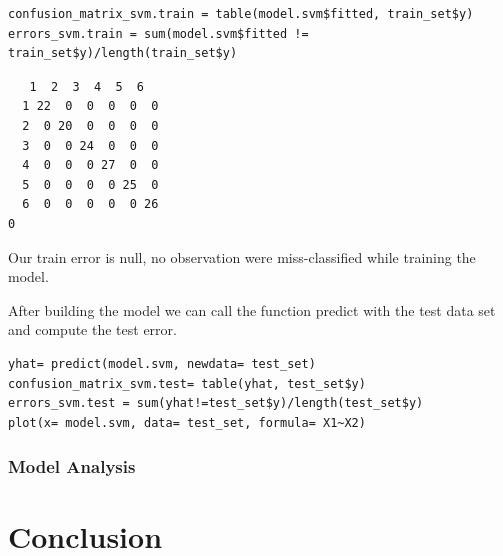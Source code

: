 \documentclass[]{report}
\begin{document}
\begin{lstlisting}
confusion_matrix_svm.train = table(model.svm$fitted, train_set$y)
errors_svm.train = sum(model.svm$fitted != train_set$y)/length(train_set$y)
\end{lstlisting}
\begin{verbatim}
   1  2  3  4  5  6
  1 22  0  0  0  0  0
  2  0 20  0  0  0  0
  3  0  0 24  0  0  0
  4  0  0  0 27  0  0
  5  0  0  0  0 25  0
  6  0  0  0  0  0 26
0
\end{verbatim}
Our train error is null, no observation were miss-classified while training the model.

After building the model we can call the function predict with the test data set and compute the test error.
\begin{lstlisting}
yhat= predict(model.svm, newdata= test_set)
confusion_matrix_svm.test= table(yhat, test_set$y)
errors_svm.test = sum(yhat!=test_set$y)/length(test_set$y)
plot(x= model.svm, data= test_set, formula= X1~X2)
\end{lstlisting}

\subsubsection{Model Analysis}

\section{Conclusion}
\end{document}
